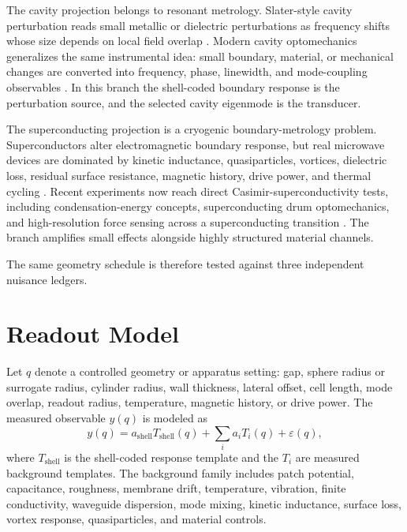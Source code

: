 \documentclass[11pt]{article}
\newcommand{\eps}{\varepsilon}
\begin{document}
The cavity projection belongs to resonant metrology. Slater-style cavity
perturbation reads small metallic or dielectric perturbations as frequency
shifts whose size depends on local field overlap
\cite{MaierSlater1952}. Modern cavity optomechanics generalizes the same
instrumental idea: small boundary, material, or mechanical changes are
converted into frequency, phase, linewidth, and mode-coupling observables
\cite{Aspelmeyer2014}. In this branch the shell-coded boundary response is the
perturbation source, and the selected cavity eigenmode is the transducer.

The superconducting projection is a cryogenic boundary-metrology problem.
Superconductors alter electromagnetic boundary response, but real microwave
devices are dominated by kinetic inductance, quasiparticles, vortices,
dielectric loss, residual surface resistance, magnetic history, drive power,
and thermal cycling \cite{Gurevich2023}. Recent experiments now reach direct
Casimir-superconductivity tests, including condensation-energy concepts,
superconducting drum optomechanics, and high-resolution force sensing across a
superconducting transition \cite{Perez2020,DeJong2025,Xu2026}. The branch
amplifies small effects alongside highly structured material channels.

The same geometry schedule is therefore tested against three independent
nuisance ledgers.

\section{Readout Model}

Let \(q\) denote a controlled geometry or apparatus setting: gap, sphere
radius or surrogate radius, cylinder radius, wall thickness, lateral offset,
cell length, mode overlap, readout radius, temperature, magnetic history, or
drive power. The measured observable \(y(q)\) is modeled as
\begin{equation}
  y(q) =
  a_{\mathrm{shell}} T_{\mathrm{shell}}(q)
  + \sum_i a_i T_i(q)
  + \eps(q),
  \label{eq:template_fit}
\end{equation}
where \(T_{\mathrm{shell}}\) is the shell-coded response template and the
\(T_i\) are measured background templates. The background family includes
patch potential, capacitance, roughness, membrane drift, temperature,
vibration, finite conductivity, waveguide dispersion, mode mixing, kinetic
inductance, surface loss, vortex response, quasiparticles, and material
controls.
\end{document}
